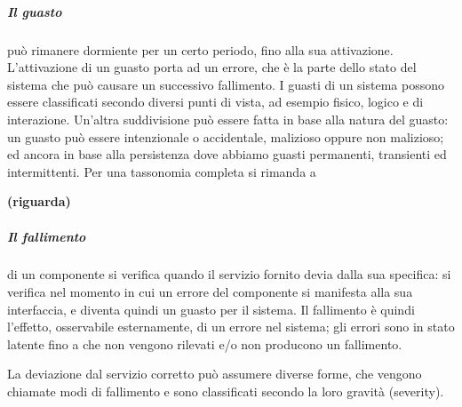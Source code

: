 \documentclass[14pt]{extarticle}
\begin{document}
\subparagraph{Il guasto} può rimanere dormiente per un certo periodo, fino alla sua attivazione. L'attivazione di un guasto porta ad un errore, che è la parte dello
stato del sistema che può causare un successivo fallimento. 
I guasti di un sistema possono essere classificati secondo diversi punti di vista, ad esempio
fisico, logico e di interazione. Un'altra suddivisione può essere fatta in base
alla natura del guasto: un guasto può essere intenzionale o accidentale, malizioso oppure non malizioso; ed ancora in base alla persistenza dove abbiamo
guasti permanenti, transienti ed intermittenti. Per una tassonomia completa
si rimanda a \cite{avizienis2004basic} 

\textbf{(riguarda)}
\subparagraph{Il fallimento} di un componente si verifica quando il servizio fornito devia
dalla sua specifica: si verifica nel momento in cui un errore del componente
si manifesta alla sua interfaccia, e diventa quindi un guasto per il sistema. Il
fallimento è quindi l'effetto, osservabile esternamente, di un errore nel sistema; gli errori sono in stato latente fino a che non vengono rilevati e/o non
producono un fallimento.

La deviazione dal servizio corretto può assumere diverse forme, che vengono chiamate modi di fallimento e sono classificati secondo la loro
gravità (severity).
\end{document}
